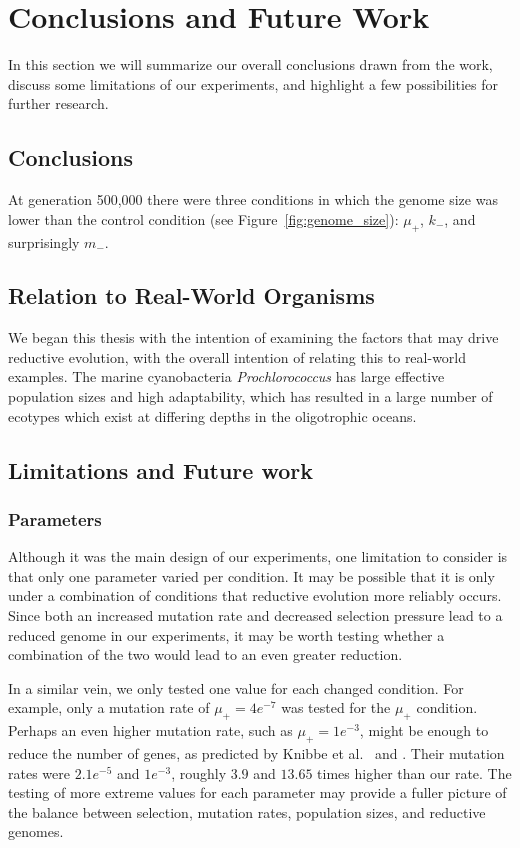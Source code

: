 
\chapter{Conclusions and Future Work}\label{ch:conclusion}
In this section we will summarize our overall conclusions drawn from the work, discuss some limitations of our experiments, and highlight a few possibilities for further research.

\section{Conclusions}
At generation 500,000 there were three conditions in which the genome size was lower than the control condition (see Figure~\ref{fig:genome_size}): $\mu_+$, $k_-$, and surprisingly $m_-$. 

\section{Relation to Real-World Organisms}
We began this thesis with the intention of examining the factors that may drive reductive evolution, with the overall intention of relating this to real-world examples. The marine cyanobacteria \textit{Prochlorococcus} has large effective population sizes and high adaptability, which has resulted in a large number of ecotypes which exist at differing depths in the oligotrophic oceans. 
  
\section{Limitations and Future work}\label{limitations}
\subsection{Parameters}
Although it was the main design of our experiments, one limitation to consider is that only one parameter varied per condition. It may be possible that it is only under a combination of conditions that reductive evolution more reliably occurs. Since both an increased mutation rate and decreased selection pressure lead to a reduced genome in our experiments, it may be worth testing whether a combination of the two would lead to an even greater reduction. 

In a similar vein, we only tested one value for each changed condition. For example, only a mutation rate of $\mu_+ = 4e^{-7}$ was tested for the $\mu_+$ condition. Perhaps an even higher mutation rate, such as $\mu_+ = 1e^{-3}$, might be enough to reduce the number of genes, as predicted by Knibbe et al.~\cite{Knibbe2007} and \cite{Liard.2018}. Their mutation rates were $2.1e^{-5}$ and $1e^{-3}$, roughly $3.9$ and $13.65$ times higher than our rate. The testing of more extreme values for each parameter may provide a fuller picture of the balance between selection, mutation rates, population sizes, and reductive genomes. 

